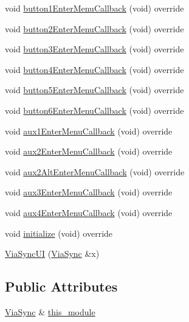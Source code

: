\begin{DoxyCompactItemize}
\item 
void \mbox{\hyperlink{class_via_sync_1_1_via_sync_u_i_a2082d2d4a5ef8cbbaa2a1d8a387b3cad}{button1\+Enter\+Menu\+Callback}} (void) override
\item 
void \mbox{\hyperlink{class_via_sync_1_1_via_sync_u_i_a92bc4b1308d5994bef5989a8e975321d}{button2\+Enter\+Menu\+Callback}} (void) override
\item 
void \mbox{\hyperlink{class_via_sync_1_1_via_sync_u_i_a695a9d89eaf1b1e03bba057e4f89b3c2}{button3\+Enter\+Menu\+Callback}} (void) override
\item 
void \mbox{\hyperlink{class_via_sync_1_1_via_sync_u_i_a01e30440d48527321570f93d67e93aa5}{button4\+Enter\+Menu\+Callback}} (void) override
\item 
void \mbox{\hyperlink{class_via_sync_1_1_via_sync_u_i_ad02cd6e9495afcd256a3b3475809bf5b}{button5\+Enter\+Menu\+Callback}} (void) override
\item 
void \mbox{\hyperlink{class_via_sync_1_1_via_sync_u_i_a114ee3916efcf43b16f6265151350e15}{button6\+Enter\+Menu\+Callback}} (void) override
\item 
void \mbox{\hyperlink{class_via_sync_1_1_via_sync_u_i_a9e9fd5bc4d9d9cfe255a8cf099ba5110}{aux1\+Enter\+Menu\+Callback}} (void) override
\item 
void \mbox{\hyperlink{class_via_sync_1_1_via_sync_u_i_a8af905460e4d9b91420fa557be0baeae}{aux2\+Enter\+Menu\+Callback}} (void) override
\item 
void \mbox{\hyperlink{class_via_sync_1_1_via_sync_u_i_a6a382c3c2660d7f232d38f5a4f7da110}{aux2\+Alt\+Enter\+Menu\+Callback}} (void) override
\item 
void \mbox{\hyperlink{class_via_sync_1_1_via_sync_u_i_a66f7a9ccbfff3b1b1ba32fe775808703}{aux3\+Enter\+Menu\+Callback}} (void) override
\item 
void \mbox{\hyperlink{class_via_sync_1_1_via_sync_u_i_ab74dfab193404bd23e90ba1b44a0a743}{aux4\+Enter\+Menu\+Callback}} (void) override
\item 
void \mbox{\hyperlink{class_via_sync_1_1_via_sync_u_i_a0d9dbe5a0b663acc88b45b46f440db78}{initialize}} (void) override
\item 
\mbox{\hyperlink{class_via_sync_1_1_via_sync_u_i_a1bd90ed57d017480e16b7727f0b4ec65}{Via\+Sync\+UI}} (\mbox{\hyperlink{class_via_sync}{Via\+Sync}} \&x)
\end{DoxyCompactItemize}
\subsection*{Public Attributes}
\begin{DoxyCompactItemize}
\item 
\mbox{\hyperlink{class_via_sync}{Via\+Sync}} \& \mbox{\hyperlink{class_via_sync_1_1_via_sync_u_i_a15989db3913bb8fb9abf9961d1125e63}{this\+\_\+module}}
\end{DoxyCompactItemize}


